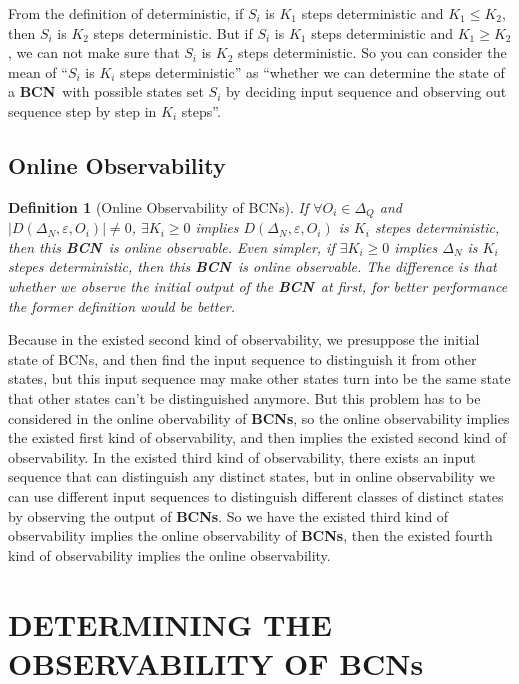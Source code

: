 \documentclass[letterpaper, 10 pt, conference]{ieeeconf}  %
\newtheorem{definition}{Definition}
\def \BCN {{\bf BCN}}
\begin{document}
From the definition of deterministic, if $S_i$ is $K_1$ steps deterministic and $K_1\leq K_2$, then $S_i$ is $K_2$ steps deterministic. But if $S_i$ is $K_1$ steps deterministic and $K_1\geq K_2$, we can not make sure that $S_i$ is $K_2$ steps deterministic. So you can consider the mean of ``$S_i$ is $K_i$ steps deterministic'' as ``whether we can determine the state of a \BCN\ with possible states set $S_i$ by deciding input sequence and observing out sequence step by step in $K_i$ steps''.
\subsection{Online Observability}
\begin{definition}[Online Observability of  BCNs]
If $\forall  O_i\in \Delta_Q$ and $|D\left(\Delta_N,\varepsilon, O_i\right)|\neq 0$, $\exists K_i \ge 0$ implies $D\left(\Delta_N,\varepsilon,O_i\right)$ is $K_i$ stepes deterministic, then this \BCN\ is online observable. Even simpler, if $\exists K_i \ge 0$ implies $\Delta_N$ is $K_i$ stepes deterministic, then this \BCN\ is online observable. The difference is that whether we observe the initial output of the \BCN\ at first, for better performance the former definition would be better.
\end{definition}

Because in the existed second kind of observability, we presuppose the initial state of BCNs, and then find the input sequence to distinguish it from other states, but this input sequence may make other states turn into be the same state that other states can't be distinguished anymore. But this problem has to be considered in the online obervability of {\bf BCNs}, so the online observability implies the existed first kind of observability, and then implies the existed second kind of observability. In the existed third kind of observability, there exists an input sequence that can distinguish any distinct states, but in online observability we can use different input sequences to distinguish different classes of distinct states by observing the output of {\bf BCNs}. So we have the existed third kind of observability implies the online observability of {\bf BCNs}, then the existed fourth kind of observability implies the online observability.

\section{DETERMINING THE OBSERVABILITY OF BCNs}
\end{document}
